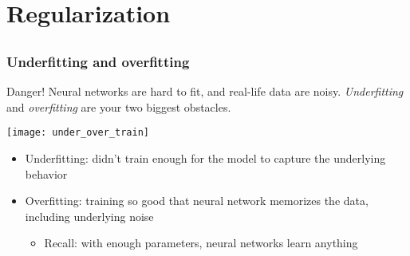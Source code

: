 \section{Regularization}

\subsection{}

\begin{frame}
    \frametitle{Underfitting and overfitting}

    \begin{alertblock}{Danger!}
        Neural networks are hard to fit, and real-life data are noisy.
        \emph{Underfitting} and \emph{overfitting} are your two biggest obstacles.
    \end{alertblock}
    \vspace{1ex}

    \texttt{[image: under\_over\_train]}
    \pause

    \begin{itemize}
        \item Underfitting: didn't train enough for the model to capture the underlying behavior
        \item Overfitting: training so good that neural network memorizes the data, including underlying noise
        \begin{itemize}
            \item Recall: with enough parameters, neural networks learn anything
        \end{itemize}
    \end{itemize}
\end{frame}

